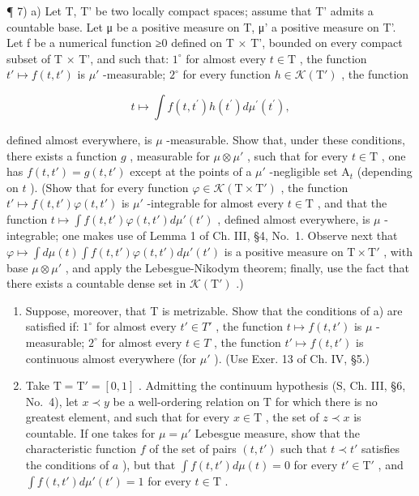 ¶ 7) a) Let T, T' be two locally compact spaces; assume that T' admits a countable base. Let μ be a positive measure on T, μ' a positive measure on T'. Let f be a numerical function ≥0 defined on T × T', bounded on every compact subset of T × T', and such that: \(1^{\circ}\) for almost every \(t \in \mathrm{T}\) , the function \(t' \mapsto f(t, t')\) is \(\mu'\) -measurable; \(2^{\circ}\) for every function \(h \in \mathcal{K}(\mathrm{T}')\) , the function

\[
t \mapsto \int f (t, t ^ {\prime}) h (t ^ {\prime}) d \mu^ {\prime} (t ^ {\prime}),
\]

defined almost everywhere, is \(\mu\) -measurable. Show that, under these conditions, there exists a function \(g\) , measurable for \(\mu \otimes \mu'\) , such that for every \(t \in \mathrm{T}\) , one has \(f(t, t') = g(t, t')\) except at the points of a \(\mu'\) -negligible set \(\mathrm{A}_t\) (depending on \(t\) ). (Show that for every function \(\varphi \in \mathcal{K}(\mathrm{T} \times \mathrm{T}')\) , the function \(t' \mapsto f(t, t')\varphi(t, t')\) is \(\mu'\) -integrable for almost every \(t \in \mathrm{T}\) , and that the function \(t \mapsto \int f(t, t')\varphi(t, t') d\mu'(t')\) , defined almost everywhere, is \(\mu\) -integrable; one makes use of Lemma 1 of Ch. III, §4, No.~1. Observe next that \(\varphi \mapsto \int d\mu(t) \int f(t, t')\varphi(t, t') d\mu'(t')\) is a positive measure on \(\mathrm{T} \times \mathrm{T}'\) , with base \(\mu \otimes \mu'\) , and apply the Lebesgue-Nikodym theorem; finally, use the fact that there exists a countable dense set in \(\mathcal{K}(\mathrm{T}')\) .)

\begin{enumerate}
\def\labelenumi{\alph{enumi})}
\setcounter{enumi}{1}
\item
  Suppose, moreover, that T is metrizable. Show that the conditions of a) are satisfied if: \(1^{\circ}\) for almost every \(t' \in T'\) , the function \(t \mapsto f(t, t')\) is \(\mu\) -measurable; \(2^{\circ}\) for almost every \(t \in T\) , the function \(t' \mapsto f(t, t')\) is continuous almost everywhere (for \(\mu'\) ). (Use Exer. 13 of Ch. IV, §5.)
\item
  Take \(\mathrm{T} = \mathrm{T}' = [0,1]\) . Admitting the continuum hypothesis (S, Ch. III, §6, No.~4), let \(x \prec y\) be a well-ordering relation on \(\mathrm{T}\) for which there is no greatest element, and such that for every \(x \in \mathrm{T}\) , the set of \(z \prec x\) is countable. If one takes for \(\mu = \mu'\) Lebesgue measure, show that the characteristic function \(f\) of the set of pairs \((t, t')\) such that \(t \prec t'\) satisfies the conditions of \(a\) ), but that \(\int f(t, t') d\mu(t) = 0\) for every \(t' \in \mathrm{T}'\) , and \(\int f(t, t') d\mu'(t') = 1\) for every \(t \in \mathrm{T}\) .
\end{enumerate}

